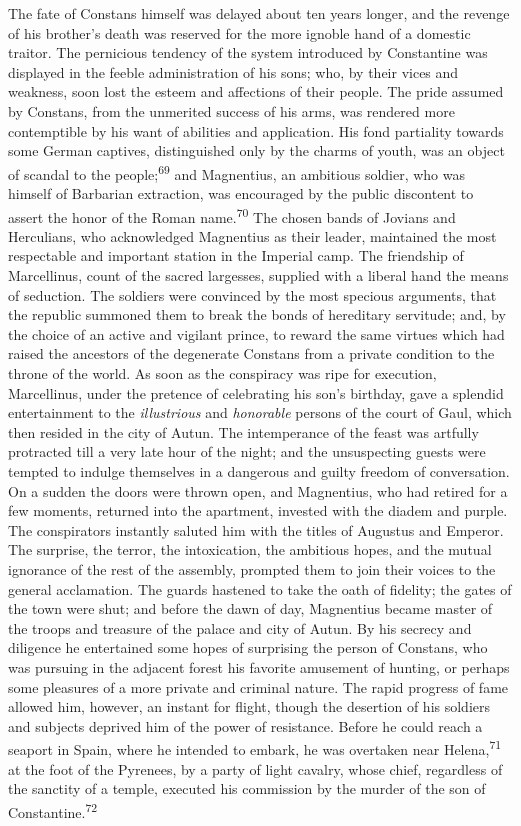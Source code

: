 The fate of Constans himself was delayed about ten years longer,
and the revenge of his brother’s death was reserved for the more
ignoble hand of a domestic traitor. The pernicious tendency of
the system introduced by Constantine was displayed in the feeble
administration of his sons; who, by their vices and weakness,
soon lost the esteem and affections of their people. The pride
assumed by Constans, from the unmerited success of his arms, was
rendered more contemptible by his want of abilities and
application. His fond partiality towards some German captives,
distinguished only by the charms of youth, was an object of
scandal to the people;\textsuperscript{69} and Magnentius, an ambitious soldier,
who was himself of Barbarian extraction, was encouraged by the
public discontent to assert the honor of the Roman name.\textsuperscript{70} The
chosen bands of Jovians and Herculians, who acknowledged
Magnentius as their leader, maintained the most respectable and
important station in the Imperial camp. The friendship of
Marcellinus, count of the sacred largesses, supplied with a
liberal hand the means of seduction. The soldiers were convinced
by the most specious arguments, that the republic summoned them
to break the bonds of hereditary servitude; and, by the choice of
an active and vigilant prince, to reward the same virtues which
had raised the ancestors of the degenerate Constans from a
private condition to the throne of the world. As soon as the
conspiracy was ripe for execution, Marcellinus, under the
pretence of celebrating his son’s birthday, gave a splendid
entertainment to the \textit{illustrious} and \textit{honorable} persons of the
court of Gaul, which then resided in the city of Autun. The
intemperance of the feast was artfully protracted till a very
late hour of the night; and the unsuspecting guests were tempted
to indulge themselves in a dangerous and guilty freedom of
conversation. On a sudden the doors were thrown open, and
Magnentius, who had retired for a few moments, returned into the
apartment, invested with the diadem and purple. The conspirators
instantly saluted him with the titles of Augustus and Emperor.
The surprise, the terror, the intoxication, the ambitious hopes,
and the mutual ignorance of the rest of the assembly, prompted
them to join their voices to the general acclamation. The guards
hastened to take the oath of fidelity; the gates of the town were
shut; and before the dawn of day, Magnentius became master of the
troops and treasure of the palace and city of Autun. By his
secrecy and diligence he entertained some hopes of surprising the
person of Constans, who was pursuing in the adjacent forest his
favorite amusement of hunting, or perhaps some pleasures of a
more private and criminal nature. The rapid progress of fame
allowed him, however, an instant for flight, though the desertion
of his soldiers and subjects deprived him of the power of
resistance. Before he could reach a seaport in Spain, where he
intended to embark, he was overtaken near Helena,\textsuperscript{71} at the foot
of the Pyrenees, by a party of light cavalry, whose chief,
regardless of the sanctity of a temple, executed his commission
by the murder of the son of Constantine.\textsuperscript{72}

